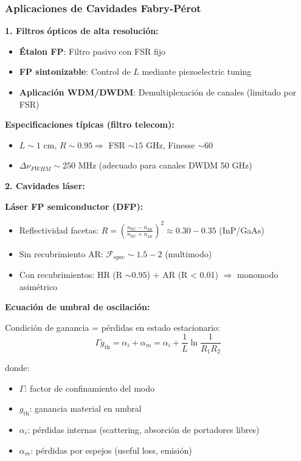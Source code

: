 \documentclass[11pt,a4paper]{article}
\begin{document}
\subsubsection{Aplicaciones de Cavidades Fabry-Pérot}

\textbf{1. Filtros ópticos de alta resolución:}

\begin{itemize}
    \item \textbf{Étalon FP}: Filtro pasivo con FSR fijo
    \item \textbf{FP sintonizable}: Control de $L$ mediante piezoelectric tuning
    \item \textbf{Aplicación WDM/DWDM}: Demultiplexación de canales (limitado por FSR)
\end{itemize}

\textbf{Especificaciones típicas (filtro telecom):}
\begin{itemize}
    \item $L \sim 1$ cm, $R \sim 0.95 \Rightarrow$ FSR $\sim 15$ GHz, Finesse $\sim 60$
    \item $\Delta\nu_{FWHM} \sim 250$ MHz (adecuado para canales DWDM 50 GHz)
\end{itemize}

\textbf{2. Cavidades láser:}

\textbf{Láser FP semiconductor (DFP):}
\begin{itemize}
    \item Reflectividad facetas: $R = \left(\frac{n_{\text{SC}} - n_{\text{air}}}{n_{\text{SC}} + n_{\text{air}}}\right)^2 \approx 0.30-0.35$ (InP/GaAs)
    \item Sin recubrimiento AR: $\mathcal{F}_{\text{spec}} \sim 1.5-2$ (multimodo)
    \item Con recubrimientos: HR (R $\sim 0.95$) + AR (R < 0.01) $\Rightarrow$ monomodo asimétrico
\end{itemize}

\textbf{Ecuación de umbral de oscilación:}

Condición de ganancia = pérdidas en estado estacionario:
\begin{equation}
    \Gamma g_{\text{th}} = \alpha_i + \alpha_m = \alpha_i + \frac{1}{L}\ln\frac{1}{R_1R_2}
\end{equation}

donde:
\begin{itemize}
    \item $\Gamma$: factor de confinamiento del modo
    \item $g_{\text{th}}$: ganancia material en umbral
    \item $\alpha_i$: pérdidas internas (scattering, absorción de portadores libres)
    \item $\alpha_m$: pérdidas por espejos (useful loss, emisión)
\end{itemize}
\end{document}

